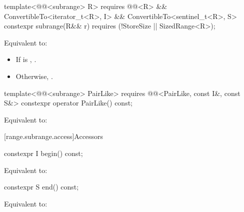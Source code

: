 %
\begin{itemdecl}
template<@@<subrange> R>
  requires @@<R> &&
           ConvertibleTo<iterator_t<R>, I> && ConvertibleTo<sentinel_t<R>, S>
constexpr subrange(R&& r) requires (!StoreSize || SizedRange<R>);
\end{itemdecl}

\begin{itemdescr}
\pnum
\effects Equivalent to:
\begin{itemize}
\item If  is ,
.
\item Otherwise, .
\end{itemize}
\end{itemdescr}

%
\begin{itemdecl}
template<@@<subrange> PairLike>
  requires @@<PairLike, const I&, const S&>
constexpr operator PairLike() const;
\end{itemdecl}

\begin{itemdescr}
\pnum
\effects Equivalent to: 
\end{itemdescr}

[range.subrange.access]{Accessors}

%
\begin{itemdecl}
constexpr I begin() const;
\end{itemdecl}

\begin{itemdescr}
\pnum
\effects Equivalent to: 
\end{itemdescr}

%
\begin{itemdecl}
constexpr S end() const;
\end{itemdecl}

\begin{itemdescr}
\pnum
\effects Equivalent to: 
\end{itemdescr}

